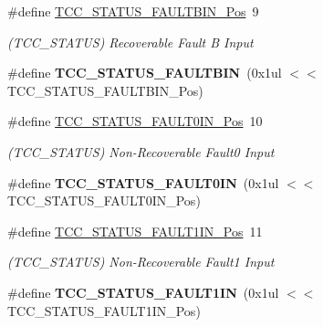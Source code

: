 \begin{DoxyCompactItemize}
\item 
\hypertarget{group___s_a_m_l21___t_c_c_ga5e5c1ff750a5085cd2c402c22d513797}{}\#define \hyperlink{group___s_a_m_l21___t_c_c_ga5e5c1ff750a5085cd2c402c22d513797}{T\+C\+C\+\_\+\+S\+T\+A\+T\+U\+S\+\_\+\+F\+A\+U\+L\+T\+B\+I\+N\+\_\+\+Pos}~9\label{group___s_a_m_l21___t_c_c_ga5e5c1ff750a5085cd2c402c22d513797}

\begin{DoxyCompactList}\small\item\em (T\+C\+C\+\_\+\+S\+T\+A\+T\+U\+S) Recoverable Fault B Input \end{DoxyCompactList}\item 
\hypertarget{group___s_a_m_l21___t_c_c_gafb26bc553212f933c0fc77c2639c2217}{}\#define {\bfseries T\+C\+C\+\_\+\+S\+T\+A\+T\+U\+S\+\_\+\+F\+A\+U\+L\+T\+B\+I\+N}~(0x1ul $<$$<$ T\+C\+C\+\_\+\+S\+T\+A\+T\+U\+S\+\_\+\+F\+A\+U\+L\+T\+B\+I\+N\+\_\+\+Pos)\label{group___s_a_m_l21___t_c_c_gafb26bc553212f933c0fc77c2639c2217}

\item 
\hypertarget{group___s_a_m_l21___t_c_c_ga842196a1cdca02b5e0c2ed5511700ae8}{}\#define \hyperlink{group___s_a_m_l21___t_c_c_ga842196a1cdca02b5e0c2ed5511700ae8}{T\+C\+C\+\_\+\+S\+T\+A\+T\+U\+S\+\_\+\+F\+A\+U\+L\+T0\+I\+N\+\_\+\+Pos}~10\label{group___s_a_m_l21___t_c_c_ga842196a1cdca02b5e0c2ed5511700ae8}

\begin{DoxyCompactList}\small\item\em (T\+C\+C\+\_\+\+S\+T\+A\+T\+U\+S) Non-\/\+Recoverable Fault0 Input \end{DoxyCompactList}\item 
\hypertarget{group___s_a_m_l21___t_c_c_ga298ebcca86ef4979d6374215c5f34c92}{}\#define {\bfseries T\+C\+C\+\_\+\+S\+T\+A\+T\+U\+S\+\_\+\+F\+A\+U\+L\+T0\+I\+N}~(0x1ul $<$$<$ T\+C\+C\+\_\+\+S\+T\+A\+T\+U\+S\+\_\+\+F\+A\+U\+L\+T0\+I\+N\+\_\+\+Pos)\label{group___s_a_m_l21___t_c_c_ga298ebcca86ef4979d6374215c5f34c92}

\item 
\hypertarget{group___s_a_m_l21___t_c_c_ga04fe7b028ee7e04a2cea5a333d31ebd4}{}\#define \hyperlink{group___s_a_m_l21___t_c_c_ga04fe7b028ee7e04a2cea5a333d31ebd4}{T\+C\+C\+\_\+\+S\+T\+A\+T\+U\+S\+\_\+\+F\+A\+U\+L\+T1\+I\+N\+\_\+\+Pos}~11\label{group___s_a_m_l21___t_c_c_ga04fe7b028ee7e04a2cea5a333d31ebd4}

\begin{DoxyCompactList}\small\item\em (T\+C\+C\+\_\+\+S\+T\+A\+T\+U\+S) Non-\/\+Recoverable Fault1 Input \end{DoxyCompactList}\item 
\hypertarget{group___s_a_m_l21___t_c_c_ga8be88a84fb3dca63b3fd5055ee6d6241}{}\#define {\bfseries T\+C\+C\+\_\+\+S\+T\+A\+T\+U\+S\+\_\+\+F\+A\+U\+L\+T1\+I\+N}~(0x1ul $<$$<$ T\+C\+C\+\_\+\+S\+T\+A\+T\+U\+S\+\_\+\+F\+A\+U\+L\+T1\+I\+N\+\_\+\+Pos)\label{group___s_a_m_l21___t_c_c_ga8be88a84fb3dca63b3fd5055ee6d6241}


\end{DoxyCompactItemize}
